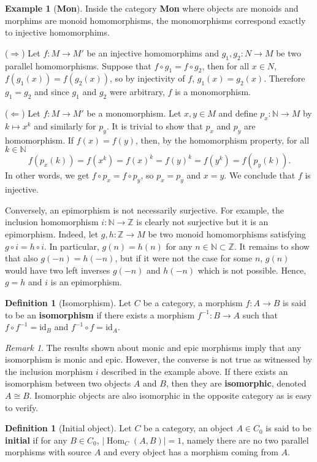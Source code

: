 \documentclass{article}
\theoremstyle{definition}
\newtheorem{defn}[thm]{Definition}
\newtheorem{exmp}[thm]{Example}
\theoremstyle{remark}
\newtheorem{rem}[thm]{Remark}
\newcommand{\N}{\mathbb{N}}
\newcommand{\Z}{\mathbb{Z}}
\DeclareMathOperator{\Hom}{Hom}
\newcommand{\id}{\text{id}}
\begin{document}
\begin{exmp}[\textbf{Mon}]
Inside the category \textbf{Mon} where objects are monoids and morphims are monoid homomorphisms, the monomorphisms correspond exactly to injective homomorphims.

($\Rightarrow$) Let $f:M\rightarrow M'$ be an injective homomorphims and $g_1,g_2:N\rightarrow M$ be two parallel homomorphisms. Suppose that $f\circ g_1 = f\circ g_2$, then for all $x \in N$, $f(g_1(x)) = f(g_2(x))$, so by injectivity of $f$, $g_1(x) = g_2(x)$. Therefore $g_1 = g_2$ and since $g_1$ and $g_2$ were arbitrary, $f$ is a monomorphism.

($\Leftarrow$) Let $f:M\rightarrow M'$ be a monomorphism. Let $x,y \in M$ and define $p_x :\N \rightarrow M$ by $k\mapsto x^k$ and similarly for $p_y$. It is trivial to show that $p_x$ and $p_y$ are homomorphism. If $f(x) = f(y)$, then, by the homomorphism property, for all $k \in \N$
\[f(p_x(k))= f(x^k) = f(x)^k  = f(y)^k = f(y^k) = f(p_y(k)).\]
In other words, we get $f\circ p_x = f \circ p_y$, so $p_x = p_y$ and $x = y$. We conclude that $f$ is injective.

Conversely, an epimorphism is not necessarily surjective. For example, the inclusion homomorphism $i:\N \rightarrow \Z$ is clearly not surjective but it is an epimorphism. Indeed, let $g,h: \Z\rightarrow M$ be two monoid homomorphisms satisfying $g \circ i = h\circ i$. In particular, $g(n) = h(n)$ for any $n \in \N\subset \Z$. It remains to show that also $g(-n) = h(-n)$, but if it were not the case for some $n$, $g(n)$ would have two left inverses $g(-n)$ and $h(-n)$ which is not possible. Hence, $g = h$ and $i$ is an epimorphism.
\end{exmp}
\begin{defn}[Isomorphism]
	Let $C$ be a category, a morphism $f:A\rightarrow B$ is said to be an \textbf{isomorphism} if there exists a morphism $f^{-1}: B\rightarrow A$ such that $f\circ f^{-1} = \id_B$ and $f^{-1}\circ f = \id_A$.
\end{defn}
\begin{rem}
	The results shown about monic and epic morphisms imply that any isomorphism is monic and epic. However, the converse is not true as witnessed by the inclusion morphism $i$ described in the example above. If there exists an isomorphism between two objects $A$ and $B$, then they are \textbf{isomorphic}, denoted $A \cong B$. Isomorphic objects are also isomorphic in the opposite category as is easy to verify.
\end{rem}
\begin{defn}[Initial object]
	Let $C$ be a category, an object $A \in C_0$ is said to be \textbf{initial} if for any $B \in C_0$, $|\Hom_C(A,B)| = 1$, namely there are no two parallel morphisms with source $A$ and every object has a morphism coming from $A$.
\end{defn}
\end{document}
